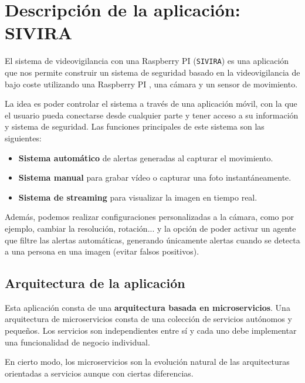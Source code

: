 


\pagestyle{miEstilo5}

\section{Descripción de la aplicación: SIVIRA}

El sistema de videovigilancia con una Raspberry PI (\texttt{SIVIRA}) es una aplicación que nos permite construir un sistema de seguridad basado en la videovigilancia de bajo coste utilizando una Raspberry PI , una cámara y un sensor de movimiento.

La idea es poder controlar el sistema a través de una aplicación móvil, con la que el usuario pueda conectarse desde cualquier parte y tener acceso a su información y sistema de seguridad. Las funciones principales de este sistema son las siguientes:

\begin{itemize}
\item \textbf{Sistema automático} de alertas generadas al capturar el movimiento.
\item \textbf{Sistema manual} para grabar vídeo o capturar una foto instantáneamente.   
\item \textbf{Sistema de streaming} para visualizar la imagen en tiempo real.
\end{itemize}

Además, podemos realizar configuraciones personalizadas a la cámara, como por ejemplo, cambiar la resolución, rotación... y la opción de poder activar un agente que filtre las alertas automáticas, generando únicamente alertas cuando se detecta a una persona en una imagen (evitar falsos positivos).

\subsection{Arquitectura de la aplicación}

Esta aplicación consta de una \textbf{arquitectura basada en microservicios}. Una arquitectura de microservicios \cite{ref25} consta de una colección de servicios autónomos y pequeños. Los servicios son independientes entre sí y cada uno debe implementar una funcionalidad de negocio individual.

En cierto modo, los microservicios son la evolución natural de las arquitecturas orientadas a servicios aunque con ciertas diferencias.

